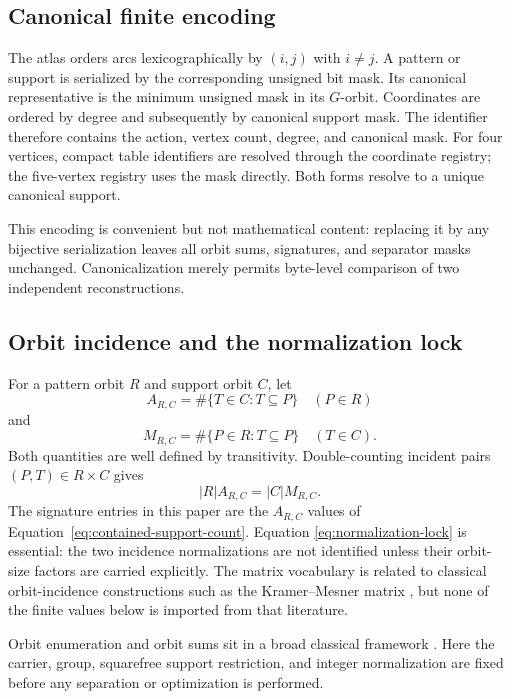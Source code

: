 \subsection{Canonical finite encoding}

The atlas orders arcs lexicographically by $(i,j)$ with $i\neq j$.  A pattern
or support is serialized by the corresponding unsigned bit mask.  Its
canonical representative is the minimum unsigned mask in its $G$-orbit.
Coordinates are ordered by degree and subsequently by canonical support mask.
The identifier therefore contains the action, vertex count, degree, and
canonical mask.  For four vertices, compact table identifiers are resolved
through the coordinate registry; the five-vertex registry uses the mask
directly.  Both forms resolve to a unique canonical support.

This encoding is convenient but not mathematical content: replacing it by
any bijective serialization leaves all orbit sums, signatures, and separator
masks unchanged.  Canonicalization merely permits byte-level comparison of
two independent reconstructions.

\subsection{Orbit incidence and the normalization lock}

For a pattern orbit $R$ and support orbit $C$, let
\[
 A_{R,C}=\#\{T\in C:T\subseteq P\}\quad(P\in R)
\]
and
\[
 M_{R,C}=\#\{P\in R:T\subseteq P\}\quad(T\in C).
\]
Both quantities are well defined by transitivity.  Double-counting incident
pairs $(P,T)\in R\times C$ gives
\begin{equation}
  |R|A_{R,C}=|C|M_{R,C}.
  \label{eq:normalization-lock}
\end{equation}
The signature entries in this paper are the $A_{R,C}$ values of
Equation~\eqref{eq:contained-support-count}.  Equation
\eqref{eq:normalization-lock} is essential: the two incidence normalizations
are not identified unless their orbit-size factors are carried explicitly.
The matrix vocabulary is related to classical orbit-incidence constructions
such as the Kramer--Mesner matrix \cite{KramerMesner1976}, but none of the
finite values below is imported from that literature.

Orbit enumeration and orbit sums sit in a broad classical framework
\cite{Polya1937,Mnukhin1992,RadcliffeScott2006}.  Here the carrier, group,
squarefree support restriction, and integer normalization are fixed before
any separation or optimization is performed.
